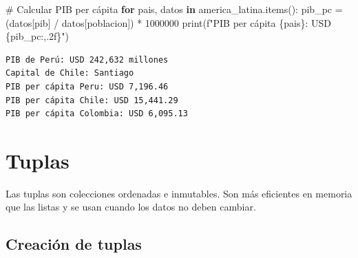 \documentclass[
  doc,
  floatsintext,
  longtable,
  a4paper,
  nolmodern,
  notxfonts,
  notimes,
  12pt,
  colorlinks=true,linkcolor=blue,citecolor=blue,urlcolor=blue]{apa7}
\newenvironment{Shaded}{\begin{snugshade}}{\end{snugshade}}
\newcommand{\BuiltInTok}[1]{\textcolor[rgb]{0.00,0.23,0.31}{#1}}
\newcommand{\CommentTok}[1]{\textcolor[rgb]{0.37,0.37,0.37}{#1}}
\newcommand{\ControlFlowTok}[1]{\textcolor[rgb]{0.00,0.23,0.31}{\textbf{#1}}}
\newcommand{\DecValTok}[1]{\textcolor[rgb]{0.68,0.00,0.00}{#1}}
\newcommand{\KeywordTok}[1]{\textcolor[rgb]{0.00,0.23,0.31}{\textbf{#1}}}
\newcommand{\NormalTok}[1]{\textcolor[rgb]{0.00,0.23,0.31}{#1}}
\newcommand{\OperatorTok}[1]{\textcolor[rgb]{0.37,0.37,0.37}{#1}}
\newcommand{\SpecialCharTok}[1]{\textcolor[rgb]{0.37,0.37,0.37}{#1}}
\newcommand{\SpecialStringTok}[1]{\textcolor[rgb]{0.13,0.47,0.30}{#1}}
\newcommand{\StringTok}[1]{\textcolor[rgb]{0.13,0.47,0.30}{#1}}
\begin{document}
\begin{Shaded}
\begin{Highlighting}[]
\CommentTok{\# Calcular PIB per cápita}
\ControlFlowTok{for}\NormalTok{ pais, datos }\KeywordTok{in}\NormalTok{ america\_latina.items():}
\NormalTok{    pib\_pc }\OperatorTok{=}\NormalTok{ (datos[}\StringTok{\textquotesingle{}pib\textquotesingle{}}\NormalTok{] }\OperatorTok{/}\NormalTok{ datos[}\StringTok{\textquotesingle{}poblacion\textquotesingle{}}\NormalTok{]) }\OperatorTok{*} \DecValTok{1000000}
    \BuiltInTok{print}\NormalTok{(}\SpecialStringTok{f"PIB per cápita }\SpecialCharTok{\{}\NormalTok{pais}\SpecialCharTok{\}}\SpecialStringTok{: USD }\SpecialCharTok{\{}\NormalTok{pib\_pc}\SpecialCharTok{:,.2f\}}\SpecialStringTok{"}\NormalTok{)}
\end{Highlighting}
\end{Shaded}

\begin{verbatim}
PIB de Perú: USD 242,632 millones
Capital de Chile: Santiago
PIB per cápita Peru: USD 7,196.46
PIB per cápita Chile: USD 15,441.29
PIB per cápita Colombia: USD 6,095.13
\end{verbatim}

\section{Tuplas}\label{tuplas}

Las tuplas son colecciones ordenadas e inmutables. Son más eficientes en
memoria que las listas y se usan cuando los datos no deben cambiar.

\subsection{Creación de tuplas}\label{creaciuxf3n-de-tuplas}
\end{document}
